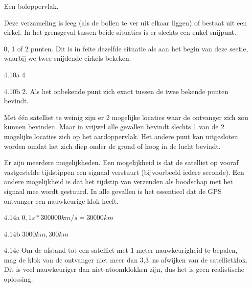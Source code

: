 \begin{Antwoord}{4.7}
		Een boloppervlak.
	
\end{Antwoord}
\begin{Antwoord}{4.8}
			Deze verzameling is leeg (als de bollen te ver uit elkaar liggen) of bestaat uit een cirkel. In het grensgeval tussen beide situaties is er slechts een enkel snijpunt.
		
\end{Antwoord}
\begin{Antwoord}{4.9}
		0, 1 of 2 punten. Dit is in feite dezelfde situatie als aan het begin van deze sectie, waarbij we twee snijdende cirkels bekeken.
	
\end{Antwoord}
\begin{Antwoord}{4.10a}
			4
		
\end{Antwoord}
\begin{Antwoord}{4.10b}
			2. Als het onbekende punt zich exact tussen de twee bekende punten bevindt.
		
\end{Antwoord}
\begin{Antwoord}{4.11}
		Met \'e\'en satelliet te weinig zijn er 2 mogelijke locaties waar de ontvanger zich zou kunnen bevinden. Maar in vrijwel alle gevallen bevindt slechts 1 van de 2 mogelijke locaties zich op het aardoppervlak. Het andere punt kan uitgesloten worden omdat het zich diep onder de grond of hoog in de lucht bevindt.
	
\end{Antwoord}
\begin{Antwoord}{4.13}
		Er zijn meerdere mogelijkheden. Een mogelijkheid is dat de satelliet op vooraf vastgestelde tijdstippen een signaal verstuurt (bijvoorbeeld iedere seconde). Een andere mogelijkheid is dat het tijdstip van verzenden als boodschap met het signaal mee wordt gestuurd. In alle gevallen is het essentieel dat de GPS ontvanger een nauwkeurige klok heeft.
	
\end{Antwoord}
\begin{Antwoord}{4.14a}
			$0,1 s * 300000 km/s = 30000 km$
		
\end{Antwoord}
\begin{Antwoord}{4.14b}
			$3000 km, 300 km$
		
\end{Antwoord}
\begin{Antwoord}{4.14c}
			Om de afstand tot een satelliet met 1 meter nauwkeurigheid te bepalen, mag de klok van de ontvanger niet meer dan 3,3~ns afwijken van de satellietklok. Dit is veel nauwkeuriger dan niet-atoomklokken zijn, dus het is geen realistische oplossing.
		
\end{Antwoord}
